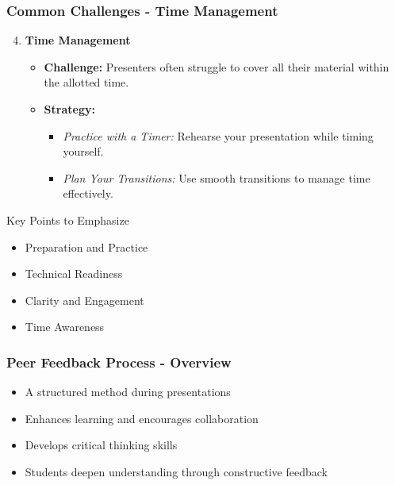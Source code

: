 \documentclass[aspectratio=169]{beamer}
\begin{document}
\begin{frame}[fragile]
    \frametitle{Common Challenges - Time Management}
    \begin{enumerate}
        \setcounter{enumi}{3}
        \item \textbf{Time Management}
        \begin{itemize}
            \item \textbf{Challenge:} Presenters often struggle to cover all their material within the allotted time.
            \item \textbf{Strategy:}
            \begin{itemize}
                \item \textit{Practice with a Timer:} Rehearse your presentation while timing yourself.
                \item \textit{Plan Your Transitions:} Use smooth transitions to manage time effectively.
            \end{itemize}
        \end{itemize}
    \end{enumerate}
    \begin{block}{Key Points to Emphasize}
        \begin{itemize}
            \item Preparation and Practice
            \item Technical Readiness
            \item Clarity and Engagement
            \item Time Awareness
        \end{itemize}
    \end{block}
\end{frame}

\begin{frame}[fragile]
    \frametitle{Peer Feedback Process - Overview}
    \begin{itemize}
        \item A structured method during presentations
        \item Enhances learning and encourages collaboration
        \item Develops critical thinking skills
        \item Students deepen understanding through constructive feedback
    \end{itemize}
\end{frame}
\end{document}
